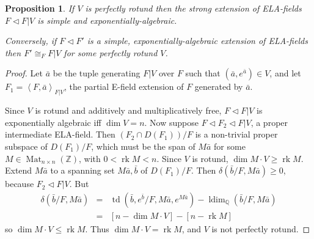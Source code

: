 \documentclass[12pt]{amsart}
\newtheorem{prop}{Proposition}[section]
\theoremstyle{definition}
\begin{document}
\begin{prop}\label{simple = perf rotund}
If $V$ is perfectly rotund then the strong extension of ELA-fields $F {\ensuremath{\lhd}} F|V$ is simple and exponentially-algebraic.

Conversely, if $F {\ensuremath{\lhd}} F'$ is a simple, exponentially-algebraic extension of ELA-fields then $F' {\cong}_F F|V$ for some perfectly rotund $V$.
\end{prop}
\begin{proof}
 Let ${{\ensuremath{\bar{a}}}}$ be the tuple generating $F|V$ over $F$ such that $({{\ensuremath{\bar{a}}}},e^{{\ensuremath{\bar{a}}}}) \in V$, and let $F_1 = {\ensuremath{\left\langle {F,{{\ensuremath{\bar{a}}}}} \right\rangle}}_{F|V}$, the partial E-field extension of $F$ generated by ${{\ensuremath{\bar{a}}}}$.

 Since $V$ is rotund and additively and multiplicatively free, $F {\ensuremath{\lhd}} F|V$ is exponentially algebraic iff $\dim V = n$. Now suppose $F {\ensuremath{\lhd}} F_2 {\ensuremath{\lhd}} F|V$, a proper
  intermediate ELA-field. Then $(F_2 \cap D(F_1))/F$ is a non-trivial
  proper subspace of $D(F_1)/F$, which must be the span of
  $M\bar{a}$ for some $M \in \operatorname{Mat}_{n {\ensuremath{\times}} n}({\ensuremath{\mathbb{Z}}})$, with $0 < \operatorname{rk} M <
  n$. Since $V$ is rotund, $\dim M\cdot V {\ensuremath{\geqslant}} \operatorname{rk} M$. Extend
  $M\bar{a}$ to a spanning set $M\bar{a},\bar{b}$ of $D(F_1)/F$.
  Then $\delta(\bar{b}/F, M\bar{a}) {\ensuremath{\geqslant}} 0$, because $F_2 {\ensuremath{\lhd}}
  F|V$. But
  \begin{eqnarray*}
    \delta(\bar{b}/F, M\bar{a}) & = & \operatorname{td}(\bar{b},e^{\bar{b}}/F,
    M\bar{a}, e^{M\bar{a}}) - \operatorname{ldim}_{\ensuremath{\mathbb{Q}}}(\bar{b}/F, M\bar{a})\\
    &=& [n - \dim M\cdot V] - [n - \operatorname{rk} M]
  \end{eqnarray*}
  so $\dim M \cdot V {\ensuremath{\leqslant}} \operatorname{rk} M$. Thus $\dim M \cdot V = \operatorname{rk} M$, and
  $V$ is not perfectly rotund.


\end{proof}
\end{document}
